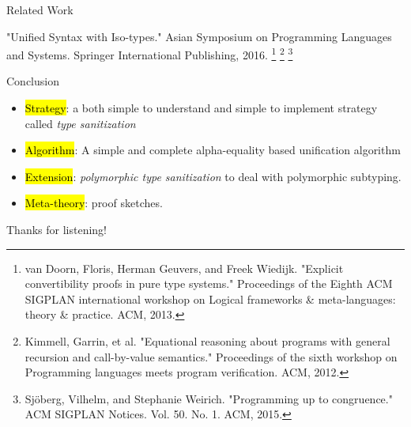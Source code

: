 \documentclass{beamer}
\begin{document}
\begin{frame}{Related Work}
\begin{itemize}
\begin{itemize}
{              "Unified Syntax with Iso-types." Asian Symposium on Programming
              Languages and Systems. Springer International Publishing, 2016.}
            \footnote{van Doorn, Floris, Herman Geuvers, and Freek Wiedijk.
              "Explicit convertibility proofs in pure type systems." Proceedings
              of the Eighth ACM SIGPLAN international workshop on Logical
              frameworks \& meta-languages: theory \& practice. ACM, 2013.}
            \footnote{Kimmell, Garrin, et al. "Equational reasoning about
              programs with general recursion and call-by-value semantics."
              Proceedings of the sixth workshop on Programming languages meets
              program verification. ACM, 2012.}
            \footnote{Sjöberg, Vilhelm, and Stephanie Weirich. "Programming up
              to congruence." ACM SIGPLAN Notices. Vol. 50. No. 1. ACM, 2015.}
  \end{itemize}
\end{itemize}
\end{frame}

\begin{frame}{Conclusion}
\begin{itemize}
  \item \hl{Strategy}: a both simple to understand and simple
    to implement strategy called \textit{type sanitization}
  \item \hl{Algorithm}: A simple and complete alpha-equality based unification
    algorithm
  \item \hl{Extension}: \textit{polymorphic type sanitization} to deal with
    polymorphic subtyping.
  \item \hl{Meta-theory}: proof sketches.
\end{itemize}
\end{frame}

\begin{frame}
  \begin{center}
  \Huge Thanks for listening!
  \end{center}
\end{frame}
\end{document}
